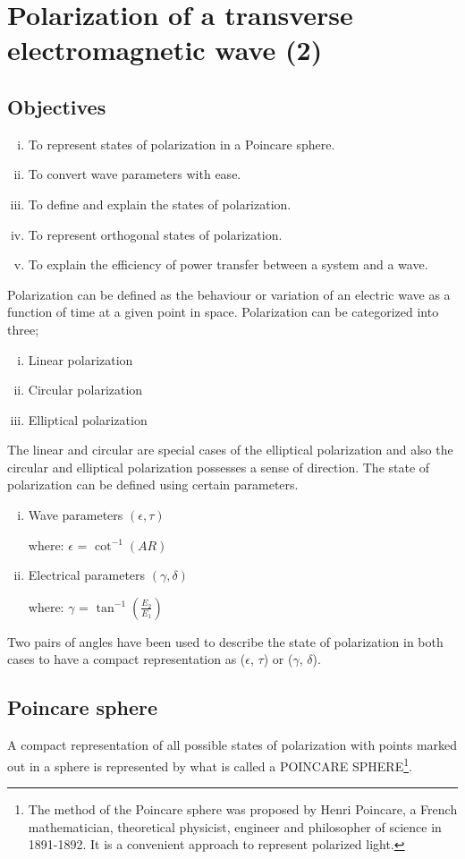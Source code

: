 \chapter{Polarization of a transverse electromagnetic wave (2)}\label{lec:lec24}
\section{Objectives}
\begin{enumerate}[(i)]
\item To represent states of polarization in a Poincare sphere.
\item To convert wave parameters with ease.
\item To define and explain the states of polarization.
\item To represent orthogonal states of polarization. 
\item To explain the efficiency of power transfer between a system and a wave.
\end{enumerate}

Polarization can be defined as the behaviour or variation of an electric wave as a function of time at a given point in space. Polarization can be categorized into three; 
\begin{enumerate}[(i)]
\item Linear polarization
\item Circular polarization
\item Elliptical polarization
\end{enumerate}
The linear and circular are special cases of the elliptical polarization and also the circular and elliptical polarization possesses a sense of direction. The state of polarization can be defined using certain parameters.
\begin{enumerate}[(i)]
\item Wave parameters $(\epsilon,\tau)$

where: $\epsilon$ = $\cot^{-1}(AR)$
\item Electrical parameters $(\gamma, \delta)$

where: $\gamma$ = $\tan^{-1} (\frac{E_{2}}{E_{1}})$
\end{enumerate}
Two pairs of angles have been used to describe the state of polarization in both cases to have a compact representation as ($\epsilon$, $\tau$)  or ($\gamma$, $\delta$).

\section{Poincare sphere}
A compact representation of all possible states of polarization with points marked out in a sphere is represented by what is called a POINCARE SPHERE\footnote{
The method of the Poincare sphere was proposed by Henri Poincare, a French mathematician, theoretical physicist, engineer and philosopher of science in 1891-1892. It is a convenient approach to represent polarized light.
}.

